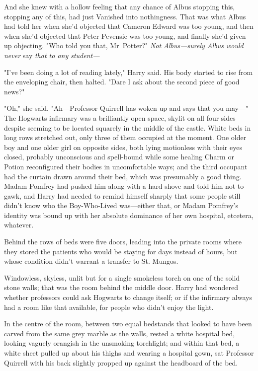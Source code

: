 And she knew with a hollow feeling that any chance of Albus stopping this,
stopping any of this, had just Vanished into nothingness. That was what Albus
had told her when she’d objected that Cameron Edward was too young, and then
when she’d objected that Peter Pevensie was too young, and finally she’d given
up objecting. "Who told you that, Mr~Potter?" \emph{Not Albus—surely Albus
would never} say \emph{that to any student—}

"I’ve been doing a lot of reading lately," Harry said. His body started to rise
from the enveloping chair, then halted. "Dare I ask about the second piece of
good news?"

"Oh," she said. "Ah—Professor Quirrell has woken up and says that you may—"
\later
The Hogwarts infirmary was a brilliantly open space, skylit on all four sides
despite seeming to be located squarely in the middle of the castle. White beds
in long rows stretched out, only three of them occupied at the moment. One
older boy and one older girl on opposite sides, both lying motionless with
their eyes closed, probably unconscious and spell-bound while some healing
Charm or Potion reconfigured their bodies in uncomfortable ways; and the third
occupant had the curtain drawn around their bed, which was presumably a good
thing. Madam Pomfrey had pushed him along with a hard shove and told him not to
gawk, and Harry had needed to remind himself sharply that some people still
didn’t know who the Boy-Who-Lived was—either that, or Madam Pomfrey’s
identity was bound up with her absolute dominance of her own hospital,
etcetera, whatever.

Behind the rows of beds were five doors, leading into the private rooms where
they stored the patients who would be staying for days instead of hours, but
whose condition didn’t warrant a transfer to St. Mungos.

Windowless, skyless, unlit but for a single smokeless torch on one of the solid
stone walls; that was the room behind the middle door. Harry had wondered
whether professors could ask Hogwarts to change itself; or if the infirmary
always had a room like that available, for people who didn’t enjoy the light.

In the centre of the room, between two equal bedstands that looked to have been
carved from the same grey marble as the walls, rested a white hospital bed,
looking vaguely orangish in the unsmoking torchlight; and within that bed, a
white sheet pulled up about his thighs and wearing a hospital gown, sat
Professor Quirrell with his back slightly propped up against the headboard of
the bed.

